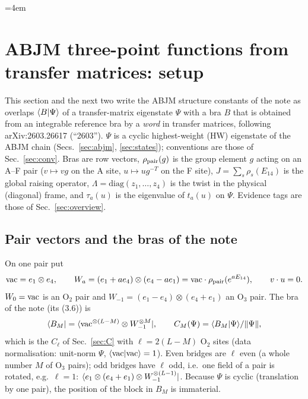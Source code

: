 \begingroup\emergencystretch=4em %
\section{ABJM three-point functions from transfer matrices: setup}\label{sec:3pt}

This section and the next two write the ABJM structure constants of the note  as overlaps
$\langle B|\Psi\rangle$ of a transfer-matrix eigenstate $\Psi$ with a bra $B$ that is obtained from an integrable reference bra
by a \emph{word} in transfer matrices, following arXiv:2603.26617 (``2603''). $\Psi$ is a cyclic highest-weight (HW)
eigenstate of the ABJM chain (Secs.~\ref{sec:abjm}, \ref{sec:states}); conventions are those of Sec.~\ref{sec:conv}.
Bras are row vectors, $\rho_{\rm pair}(g)$ is the group element $g$ acting on an A--F pair ($v\mapsto vg$ on the A site,
$u\mapsto ug^{-T}$ on the F site), $J=\sum_s\rho_s(E_{14})$ is the global raising operator, $\Lambda=\mathrm{diag}(z_1,\dots,z_4)$ is
the twist in the physical (diagonal) frame, and $\tau_a(u)$ is the eigenvalue of $t_a(u)$ on $\Psi$. Evidence tags are
those of Sec.~\ref{sec:overview}.

\subsection{Pair vectors and the bras of the note}\label{sec:3pt-bras}

On one pair put
\begin{equation}\label{eq:3pt-W}
 \mathrm{vac}=e_1\otimes e_4,\qquad
 W_a=(e_1+ae_4)\otimes(e_4-ae_1)=\mathrm{vac}\cdot\rho_{\rm pair}(e^{aE_{14}}),\qquad v\cdot u=0 .
\end{equation}
$W_0=\mathrm{vac}$ is an O$_2$ pair and $W_{-1}=(e_1-e_4)\otimes(e_4+e_1)$ an O$_3$ pair. The bra of the note (its (3.6)) is
\begin{equation}\label{eq:3pt-B}
 \langle B_M|=\langle\mathrm{vac}^{\otimes(L-M)}\otimes W_{-1}^{\otimes M}|,\qquad C_M(\Psi)=\langle B_M|\Psi\rangle/\|\Psi\| ,
\end{equation}
which is the $C_\ell$ of Sec.~\ref{sec:C} with $\ell=2(L-M)$ O$_2$ sites (data normalisation: unit-norm $\Psi$, $\langle\mathrm{vac}|\mathrm{vac}\rangle=1$).
Even bridges are $\ell$ even (a whole number $M$ of O$_3$ pairs); odd bridges have $\ell$ odd, i.e.\ one field of a pair
is rotated, e.g.\ $\ell=1$: $\langle e_1\otimes(e_4+e_1)\otimes W_{-1}^{\otimes(L-1)}|$. Because $\Psi$ is cyclic (translation by one
pair), the position of the block in $B_M$ is immaterial.

